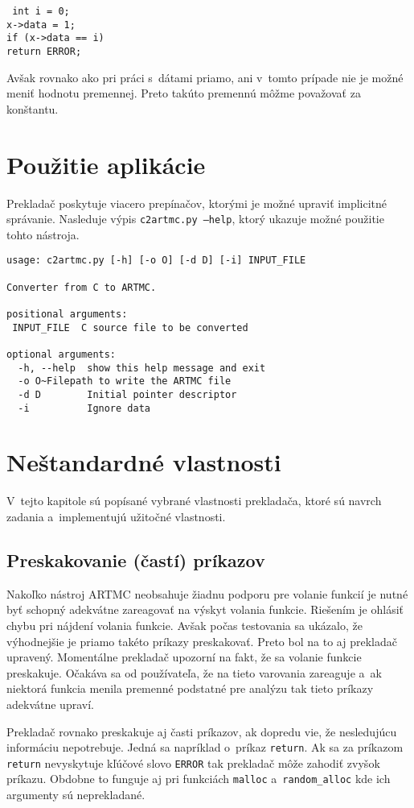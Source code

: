 \noindent
\texttt{
\tab int i~= 0;\\
\tab x->data = 1;\\
\tab if (x->data == i)\\
\tab \tab return ERROR;\\
}

Avšak rovnako ako pri práci s~dátami priamo, ani v~tomto prípade nie je možné meniť hodnotu premennej. Preto takúto premennú môžme považovať za konštantu.

\section{Použitie aplikácie}
Prekladač poskytuje viacero prepínačov, ktorými je možné upraviť implicitné správanie.  Nasleduje výpis \texttt{c2artmc.py --help}, ktorý ukazuje možné použitie tohto nástroja.
\begin{verbatim}
usage: c2artmc.py [-h] [-o O] [-d D] [-i] INPUT_FILE

Converter from C to ARTMC.

positional arguments:
 INPUT_FILE  C source file to be converted

optional arguments:
  -h, --help  show this help message and exit
  -o O~Filepath to write the ARTMC file
  -d D        Initial pointer descriptor
  -i          Ignore data
\end{verbatim}

\section{Neštandardné vlastnosti}
\label{sec_features}
V~tejto kapitole sú popísané vybrané vlastnosti prekladača, ktoré sú navrch zadania a~implementujú užitočné vlastnosti.
\subsection{Preskakovanie (častí) príkazov}
Nakoľko nástroj ARTMC neobsahuje žiadnu podporu pre volanie funkcií je nutné byť schopný adekvátne zareagovať na výskyt volania funkcie. Riešením je ohlásiť chybu pri nájdení volania funkcie. Avšak počas testovania sa ukázalo, že výhodnejšie je priamo takéto príkazy preskakovať. Preto bol na to aj prekladač upravený. Momentálne prekladač upozorní na fakt, že sa volanie funkcie preskakuje. Očakáva sa od používateľa, že na tieto varovania zareaguje a~ak niektorá funkcia menila premenné podstatné pre analýzu tak tieto príkazy adekvátne upraví.

Prekladač rovnako preskakuje aj časti príkazov, ak dopredu vie, že nesledujúcu informáciu nepotrebuje. Jedná sa napríklad o~príkaz \texttt{return}. Ak sa za príkazom \texttt{return} nevyskytuje kľúčové slovo \texttt{ERROR} tak prekladač môže zahodiť zvyšok príkazu. Obdobne to funguje aj pri funkciách \texttt{malloc} a~\texttt{random\_alloc} kde ich argumenty sú neprekladané.

